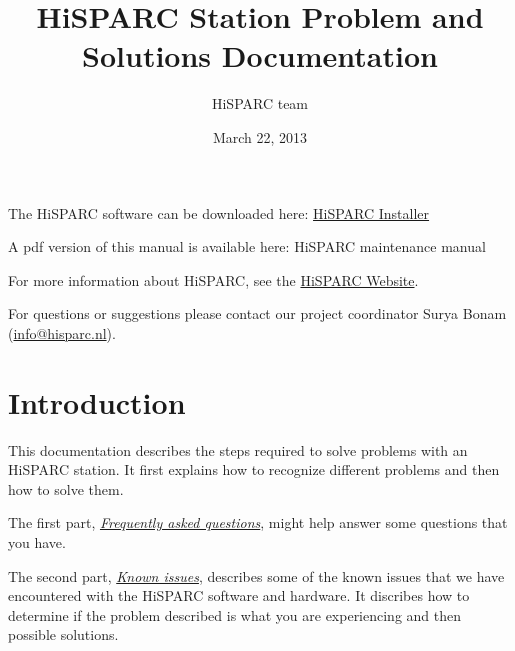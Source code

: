 \documentclass[a4paper,11pt,english]{sphinxmanual}
\title{HiSPARC Station Problem and Solutions Documentation}
\date{March 22, 2013}
\author{HiSPARC team}
\begin{document}
\maketitle
\tableofcontents
{}\label{index::doc}


The HiSPARC software can be downloaded here: \href{http://www.hisparc.nl/downloads/software/}{HiSPARC Installer}

A pdf version of this manual is available here: HiSPARC maintenance manual

For more information about HiSPARC, see the \href{http://www.hisparc.nl/}{HiSPARC Website}.

For questions or suggestions please contact our project coordinator
Surya Bonam (\href{mailto:info@hisparc.nl}{info@hisparc.nl}).


\chapter{Introduction}
\label{introduction:introduction}\label{introduction::doc}\label{introduction:welcome-to-the-hisparc-maintenance-documentation}
This documentation describes the steps required to solve problems with an HiSPARC station.  It first explains how to recognize different problems and then how to solve them.

The first part, {\hyperref[faq::doc]{\emph{Frequently asked questions}}}, might help answer some questions that you have.

The second part, {\hyperref[known-issues::doc]{\emph{Known issues}}}, describes some of the known issues that we have encountered with the HiSPARC software and hardware. It discribes how to determine if the problem described is what you are experiencing and then possible solutions.
\end{document}
